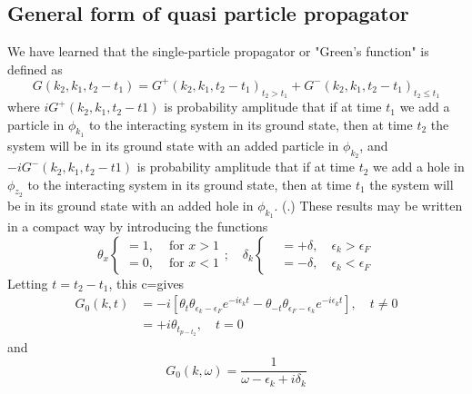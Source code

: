 \subsection{General form of quasi particle propagator}
We have learned that the single-particle propagator or "Green's function" is defined as
\begin{equation}G\left(k_{2}, k_{1}, t_{2}-t_{1}\right)=G^{+}\left(k_{2}, k_{1}, t_{2}-t_{1}\right)_{t_{2}>t_{1}}+G^{-}\left(k_{2}, k_{1}, t_{2}-t_{1}\right)_{t_{2}\leq t_{1}}\end{equation}
where $iG^+(k_2,k_1,t_2-t1)$ is probability amplitude that if at time $t_{1}$ we add a particle in $\phi_{k_{1}}$ to the interacting system in its ground state, then at time $t_{2}$ the system will be in its ground state with an added particle in $\phi_{k_{2}}$, and $-iG^-(k_2,k_1,t_2-t1)$ is probability amplitude that if at time $t_{2}$ we add a hole in $\phi_{z_{2}}$ to the interacting system in its ground state, then at time $t_{1}$ the system will be in its ground state with an added hole in $\phi_{k_{1}}$. (.) These results may be written in a compact way by introducing the functions
\begin{equation}\theta_{x}\left\{\begin{array}{lll}
=1, & \text { for } x>1 \\
=0, & \text { for } x<1
\end{array} ; \quad \delta_{k}\left\{\begin{array}{lll}
&=+\delta, \quad \epsilon_{k}>\epsilon_{F} \\
&=-\delta, \quad \epsilon_{k}<\epsilon_{F}
\end{array}\right.\right.\end{equation}
Letting $t=t_2-t_1$, this c=gives
\begin{equation}\begin{aligned}
G_{0}(k, t) &=-i\left[\theta_{t} \theta_{\epsilon_k-\epsilon_F }e^{-i\epsilon_{k} t}-\theta_{-t} \theta_{\epsilon_F-\epsilon_{k}} e^{-i\epsilon_kt}\right], \quad t \neq 0 \\
&=+i \theta_{t_{p-t_{2}}}, \quad t=0
\end{aligned}
\label{combined-G0-in-k-t-space}
\end{equation}
and
\begin{equation}G_{0}(k, \omega)=\frac{1}{\omega-\epsilon_{k}+i \delta_{k}}\end{equation}

